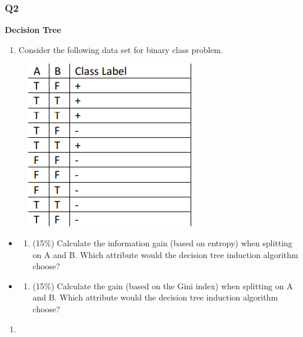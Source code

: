 \documentclass[11pt]{article}
\makeatletter
\def\maxwidth{\ifdim\Gin@nat@width>\linewidth\linewidth
    \else\Gin@nat@width\fi}
\let\Oldincludegraphics\includegraphics
\renewcommand{\includegraphics}[1]{\Oldincludegraphics[width=.8\maxwidth]{#1}}
\providecommand{\tightlist}{%
      \setlength{\itemsep}{0pt}\setlength{\parskip}{0pt}}
\makeatother
\begin{document}
    \subsubsection*{Q2}\label{q2}

    \textbf{Decision Tree}

\begin{enumerate}
\def\labelenumi{\arabic{enumi}.}
\setcounter{enumi}{1}
\tightlist
\item
  Consider the following data set for binary class problem.
\end{enumerate}

\begin{figure}[H]
\centering
\includegraphics{2.png}
\caption{}
\end{figure}

\begin{itemize}
\item
  \begin{enumerate}
  \def\labelenumi{\alph{enumi}.}
  \tightlist
  \item
    (15\%) Calculate the information gain (based on entropy) when
    splitting on A and B. Which attribute would the decision tree
    induction algorithm choose?
  \end{enumerate}
\item
  \begin{enumerate}
  \def\labelenumi{\alph{enumi}.}
  \setcounter{enumi}{1}
  \tightlist
  \item
    (15\%) Calculate the gain (based on the Gini index) when splitting
    on A and B. Which attribute would the decision tree induction
    algorithm choose?
  \end{enumerate}
\end{itemize}

    \begin{enumerate}
\def\labelenumi{(\alph{enumi})}
\item
\end{enumerate}
\end{document}
